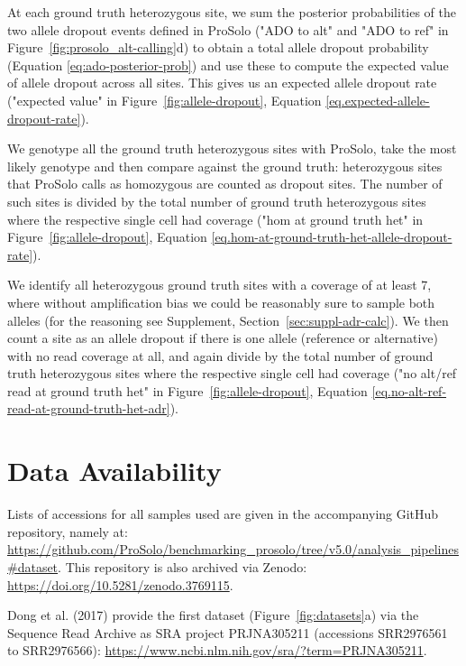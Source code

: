\documentclass[12pt,inline]{wlscirep}
\begin{document}
\begin{enumerate*}
 \item At each ground truth heterozygous site, we sum the posterior probabilities of the two allele dropout events defined in ProSolo ("ADO to alt" and "ADO to ref" in Figure~\ref{fig:prosolo_alt-calling}d) to obtain a total allele dropout probability (Equation \ref{eq:ado-posterior-prob}) and use these to compute the expected value of allele dropout across all sites.
 This gives us an expected allele dropout rate ("expected value" in Figure~\ref{fig:allele-dropout}, Equation \ref{eq.expected-allele-dropout-rate}).
 \item We genotype all the ground truth heterozygous sites with ProSolo, take the most likely genotype and then compare against the ground truth: heterozygous sites that ProSolo calls as homozygous are counted as dropout sites. The number of such sites is divided by the total number of ground truth heterozygous sites where the respective single cell had coverage ("hom at ground truth het" in Figure~\ref{fig:allele-dropout}, Equation \ref{eq.hom-at-ground-truth-het-allele-dropout-rate}).
 \item We identify all heterozygous ground truth sites with a coverage of at least 7, where without amplification bias we could be reasonably sure to sample both alleles (for the reasoning see Supplement, Section~\ref{sec:suppl-adr-calc}).
 We then count a site as an allele dropout if there is one allele (reference or alternative) with no read coverage at all, and again divide by the total number of ground truth heterozygous sites where the respective single cell had coverage ("no alt/ref read at ground truth het" in Figure~\ref{fig:allele-dropout}, Equation \ref{eq.no-alt-ref-read-at-ground-truth-het-adr}).
\end{enumerate*}


\section*{Data Availability}

Lists of accessions for all samples used are given in the accompanying GitHub repository, namely at: \url{https://github.com/ProSolo/benchmarking_prosolo/tree/v5.0/analysis_pipelines#dataset}.
This repository is also archived via Zenodo: \url{https://doi.org/10.5281/zenodo.3769115}.

Dong et al. (2017)\cite{dong_accurate_2017} provide the first dataset  (Figure~\ref{fig:datasets}a) via the Sequence Read Archive as SRA project \mbox{PRJNA305211} (accessions \mbox{SRR2976561} to \mbox{SRR2976566}): \url{https://www.ncbi.nlm.nih.gov/sra/?term=PRJNA305211}.
\end{document}
